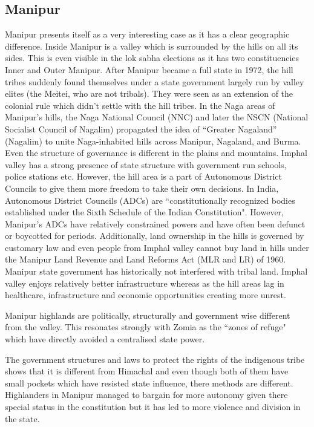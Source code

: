 \subsection{Manipur}

Manipur presents itself as a very interesting case as it has a clear geographic difference. Inside Manipur is a valley which is surrounded by the hills on all its sides. This is even visible in the lok sabha elections as it has two constituencies Inner and Outer Manipur. After Manipur became a full state in 1972, the hill tribes suddenly found themselves under a state government largely run by valley elites (the Meitei, who are not tribals). They were seen as an extension of the colonial rule which didn't settle with the hill tribes.  In the Naga areas of Manipur’s hills, the Naga National Council (NNC) and later the NSCN (National Socialist Council of Nagalim) propagated the idea of ``Greater Nagaland” (Nagalim) to unite Naga-inhabited hills across Manipur, Nagaland, and Burma. Even the structure of governance is different in the plains and mountains. Imphal valley has a strong presence of state structure with government run schools, police stations etc. However, the hill area is a part of Autonomous District Councils to give them more freedom to take their own decisions. In India, Autonomous District Councils (ADCs) are ``constitutionally recognized bodies established under the Sixth Schedule of the Indian Constitution". However, Manipur’s ADCs have relatively constrained powers and have often been defunct or boycotted for periods. Additionally, land ownership in the hills is governed by customary law and even people from Imphal valley cannot buy land in hills under the  Manipur Land Revenue and Land Reforms Act (MLR and LR) of 1960. Manipur state government has historically not interfered with tribal land. 
Imphal valley enjoys relatively better infrastructure whereas as the hill areas lag in healthcare, infrastructure and economic opportunities creating more unrest. \citep{lacina2009problem}

Manipur highlands are politically, structurally and government wise different from the valley. This resonates strongly with Zomia as the ``zones of refuge" which have directly avoided a centralised state power.

The government structures and laws to protect the rights of the indigenous tribe shows that it is different from Himachal and even though both of them have small pockets which have resisted state influence, there methods are different. Highlanders in Manipur managed to bargain for more autonomy given there special status in the constitution but it has led to more violence and division in the state.

